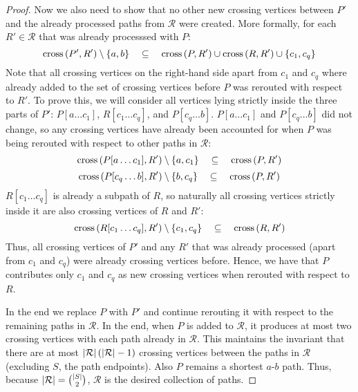 \begin{proof}
    Now we also need to show that no other new crossing vertices between $P'$ and the already processed paths from $\mathcal{R}$ were created.
    More formally, for each $R' \in \mathcal{R}$ that was already processsed with $P$:
    \begin{equation*}
        \mathrm{cross}\left( P', R' \right) \setminus \left\{ a,b \right\} \quad \subseteq \quad \mathrm{cross}\left( P, R' \right) \cup \mathrm{cross}\left( R, R' \right) \cup \left\{ c_1, c_q \right\}
    \end{equation*}
    Note that all crossing vertices on the right-hand side apart from $c_1$ and $c_q$ where already added to the set of crossing vertices
    before $P$ was rerouted with respect to $R'$.
    To prove this, we will consider all vertices lying strictly inside the three parts of $P'$:
    $P[a \dots c_1]$, $R[c_1 \dots c_q]$, and $P[c_q \dots b]$.    
    $P[a \dots c_1]$ and $P[c_q \dots b]$ did not change, so any crossing vertices have already been accounted for
    when $P$ was being rerouted with respect to other paths in $\mathcal{R}$:
    \[ \mathrm{cross}\left( P[a \dots c_1], R' \right) \setminus \left\{ a, c_1 \right\} \quad \subseteq \quad \mathrm{cross}\left( P, R' \right) \]
    \[ \mathrm{cross}\left( P[c_q \dots b], R' \right) \setminus \left\{ b, c_q \right\} \quad \subseteq \quad \mathrm{cross}\left( P, R' \right) \]
    $R[c_1 \dots c_q]$ is already a subpath of $R$,
    so naturally all crossing vertices strictly inside it are also crossing vertices of $R$ and $R'$:
    \[ \mathrm{cross}\left( R[c_1 \dots c_q], R' \right) \setminus \left\{ c_1, c_q \right\}
        \quad \subseteq \quad \mathrm{cross}\left( R, R' \right) \]
    Thus, all crossing vertices of $P'$ and any $R'$ that was already processed (apart from $c_1$ and $c_q$)
    were already crossing vertices before.
    Hence, we have that $P$ contributes only $c_1$ and $c_q$ as new crossing vertices when rerouted with respect to $R$.

    In the end we replace $P$ with $P'$ and continue rerouting it with respect to the remaining paths in $\mathcal{R}$.
    In the end, when $P$ is added to $\mathcal{R}$, it produces at most two crossing vertices with each path already in $\mathcal{R}$.
    This maintains the invariant that there are at most $\left| \mathcal{R} \right| \left(  \left| \mathcal{R} \right| - 1 \right)$
    crossing vertices between the paths in $\mathcal{R}$ (excluding $S$, the path endpoints).
    Also $P$ remains a shortest $a$-$b$ path.
    Thus, because $\left| \mathcal{R} \right| = {\left| S \right| \choose 2}$, $\mathcal{R}$ is the desired collection of paths.
    \end{proof}


